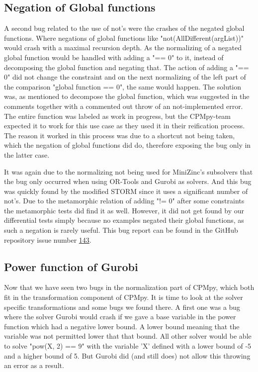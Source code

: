 \subsection{Negation of Global functions}
\label{res:bug:NegatedGlobal}
A second bug related to the use of not's were the crashes of the negated global functions. Where negations of global functions like "not(AllDifferent(argList))" would crash with a maximal recursion depth. As the normalizing of a negated global function would be handled with adding a "== 0" to it, instead of decomposing the global function and negating that. The action of adding a "== 0" did not change the constraint and on the next normalizing of the left part of the comparison "global function == 0", the same would happen. The solution was, as mentioned to decompose the global function, which was suggested in the comments together with a commented out throw of an not-implemented error. The entire function was labeled as work in progress, but the CPMpy-team expected it to work for this use case as they used it in their reification process. The reason it worked in this process was due to a shortcut not being taken, which the negation of global functions did do, therefore exposing the bug only in the latter case.

It was again due to the normalizing not being used for MiniZinc's subsolvers that the bug only occurred when using OR-Tools and Gurobi as solvers. And this bug was quickly found by the modified STORM since it uses a significant number of not's. Due to the metamorphic relation of adding "!= 0" after some constraints the metamorphic tests did find it as well. However, it did not get found by our differential tests simply because no examples negated their global functions, as such a negation is rarely useful. This bug report can be found in the GitHub repository issue number  \href{https://github.com/CPMpy/cpmpy/issues/143}{143}.

\subsection{Power function of Gurobi}
\label{res:bug:Power}
Now that we have seen two bugs in the normalization part of CPMpy, which both fit in the transformation component of CPMpy. It is time to look at the solver specific transformations and some bugs we found there. A first one was a bug where the solver Gurobi would crash if we gave a base variable in the power function which had a negative lower bound. A lower bound meaning that the variable was not permitted lower that that bound. All other solver would be able to solve "pow(X, 2) == 9" with the variable 'X' defined with a lower bound of -5 and a higher bound of 5. But Gurobi did (and still does) not allow this throwing an error as a result.


